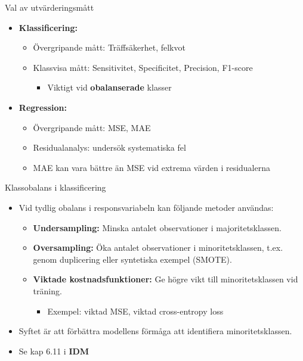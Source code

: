 \documentclass[10pt,english]{beamer}
\begin{document}
\begin{frame}{Val av utvärderingsmått}
\begin{itemize}
    \item \textbf{Klassificering:}
    \begin{itemize}
        \item Övergripande mått: Träffsäkerhet, felkvot
        \item Klassvisa mått: Sensitivitet, Specificitet, Precision, F1-score
        \begin{itemize}
          \item Viktigt vid \textbf{obalanserade} klasser
        \end{itemize}
    \end{itemize}
    \item \textbf{Regression:}
    \begin{itemize}
        \item Övergripande mått: MSE, MAE 
        \item Residualanalys: undersök systematiska fel
        \item MAE kan vara bättre än MSE vid extrema värden i residualerna
    \end{itemize}
\end{itemize}
\end{frame}

\begin{frame}{Klassobalans i klassificering}
\begin{itemize}
    \item Vid tydlig obalans i responsvariabeln kan följande metoder användas:
    \begin{itemize}
        \item \textbf{Undersampling:} Minska antalet observationer i majoritetsklassen.
        \item \textbf{Oversampling:} Öka antalet observationer i minoritetsklassen, t.ex. genom duplicering eller syntetiska exempel (SMOTE).
        \item \textbf{Viktade kostnadsfunktioner:} Ge högre vikt till minoritetsklassen vid träning.
        \begin{itemize}
            \item Exempel: viktad MSE, viktad cross-entropy loss
        \end{itemize}
    \end{itemize}
    \item Syftet är att förbättra modellens förmåga att identifiera minoritetsklassen.
    \item Se kap 6.11 i \textbf{IDM}
\end{itemize}
\end{frame}
\end{document}
